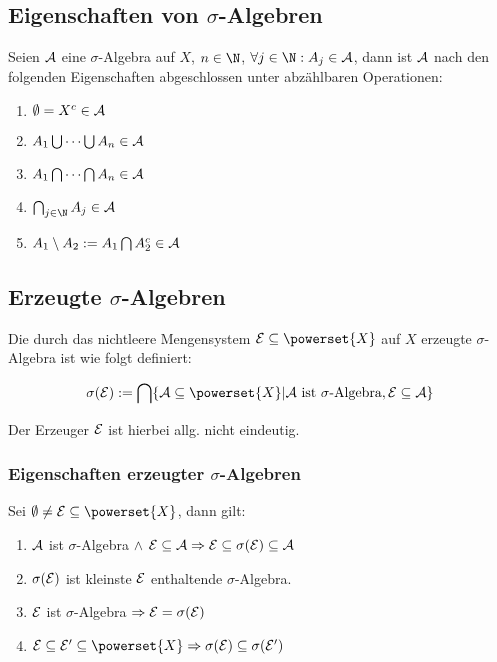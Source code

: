 \subsection*{Eigenschaften von $\sigma$-Algebren}

Seien $\mathcal{A}$ eine $\sigma$-Algebra auf $X$, $n \in \N$, $\forall j \in \N : A_j \in \A$, dann ist $\mathcal{A}$ nach den folgenden Eigenschaften abgeschlossen unter abzählbaren Operationen:

\begin{enumerate}[label=(\alph*)]
	\item $\emptyset = X^c \in \mathcal{A}$
	\item $A_1 \bigcup \cdots \bigcup A_n \in \mathcal{A}$
	\item $A_1 \bigcap \cdots \bigcap A_n \in \mathcal{A}$
	\item $\bigcap_{j\in \N} A_j \in \A$
	\item $A_1 \setminus A_2 := A_1 \bigcap A_2^c \in \mathcal{A}$
\end{enumerate}

\subsection*{Erzeugte $\sigma$-Algebren}

Die durch das nichtleere Mengensystem $\E \subseteq \powerset{X}$ auf $X$ erzeugte $\sigma$-Algebra ist wie folgt definiert:

\vspace*{-4mm}
$$\sigma(\E) := \bigcap\{ \A \subseteq \powerset{X} | \A \text{ ist } \sigma \text{-Algebra}, \E \subseteq \A \}$$

Der Erzeuger $\mathcal{E}$ ist hierbei allg. nicht eindeutig.

\subsubsection*{Eigenschaften erzeugter $\sigma$-Algebren}

Sei $\emptyset \neq \E \subseteq \powerset{X}$, dann gilt:

\begin{enumerate}[label=(\alph*)]
	\item $\mathcal{A}$ ist $\sigma$-Algebra $\land$ $\mathcal{E} \subseteq \mathcal{A} \Rightarrow \mathcal{E} \subseteq \sigma(\mathcal{E}) \subseteq \mathcal{A}$
	\item $\sigma(\mathcal{E})$ ist kleinste $\mathcal{E}$ enthaltende $\sigma$-Algebra.
	\item $\mathcal{E}$ ist $\sigma$-Algebra $\Rightarrow \mathcal{E} = \sigma(\mathcal{E})$
	\item $\E \subseteq \E' \subseteq \powerset{X} \Rightarrow \sigma(\E) \subseteq \sigma(\E')$
\end{enumerate}


